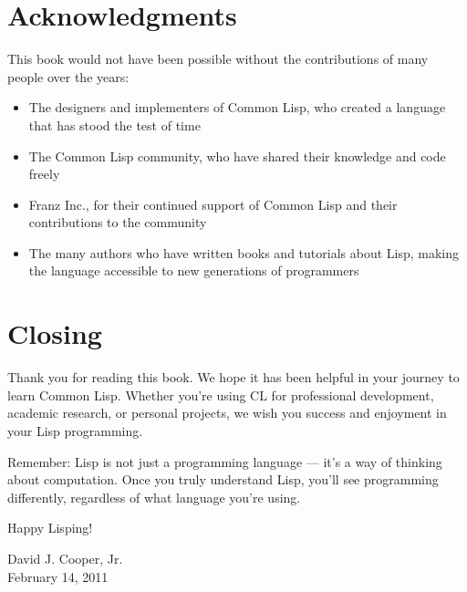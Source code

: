 \section*{Acknowledgments}

This book would not have been possible without the contributions of many people over the
years:

\begin{itemize}
\item The designers and implementers of Common Lisp, who created a language that has stood
the test of time
\item The Common Lisp community, who have shared their knowledge and code freely
\item Franz Inc., for their continued support of Common Lisp and their contributions to the
community
\item The many authors who have written books and tutorials about Lisp, making the language accessible to new generations of programmers
\end{itemize}

\section*{Closing}

Thank you for reading this book. We hope it has been helpful in your journey to learn
Common Lisp. Whether you're using CL for professional development, academic research,
or personal projects, we wish you success and enjoyment in your Lisp programming.

Remember: Lisp is not just a programming language --- it's a way of thinking about computation. Once you truly understand Lisp, you'll see programming differently, regardless of
what language you're using.

Happy Lisping!

\begin{flushright}
David J. Cooper, Jr.\\
February 14, 2011
\end{flushright}
